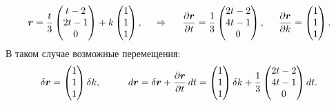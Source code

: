 \begin{equation*}
    \mbox{\boldmath $r$} = \frac{t}{3} \begin{pmatrix}
        t - 2 \\ 2t -1 \\ 0
    \end{pmatrix} + 
    k \begin{pmatrix}
        1 \\ 1 \\ 1
    \end{pmatrix},
    \hspace{0.5cm} \Rightarrow \hspace{0.5cm} 
    \frac{\partial \mbox{\boldmath $r$}}{\partial t} =
    \frac{1}{3} \begin{pmatrix}
        2t-2 \\ 4t-1 \\ 0
    \end{pmatrix},
    \hspace{0.5cm} 
    \frac{\partial \mbox{\boldmath $r$}}{\partial k} = \begin{pmatrix}
        1 \\ 1 \\ 1
    \end{pmatrix}.
\end{equation*}
В таком случае возможные перемещения:
\begin{equation*}
    \delta \mbox{\boldmath $r$} = \begin{pmatrix}
        1 \\ 1 \\ 1
    \end{pmatrix} \delta k,
    \hspace{1cm} 
    d \mbox{\boldmath $r$} = \delta \mbox{\boldmath $r$} + \frac{\partial \mbox{\boldmath $r$}}{\partial t} \, d t = 
    \begin{pmatrix}
        1 \\ 1 \\ 1
    \end{pmatrix} \delta k + 
    \frac{1}{3} \begin{pmatrix}
        2t-2 \\ 4t-1 \\ 0
    \end{pmatrix} dt.
\end{equation*}














